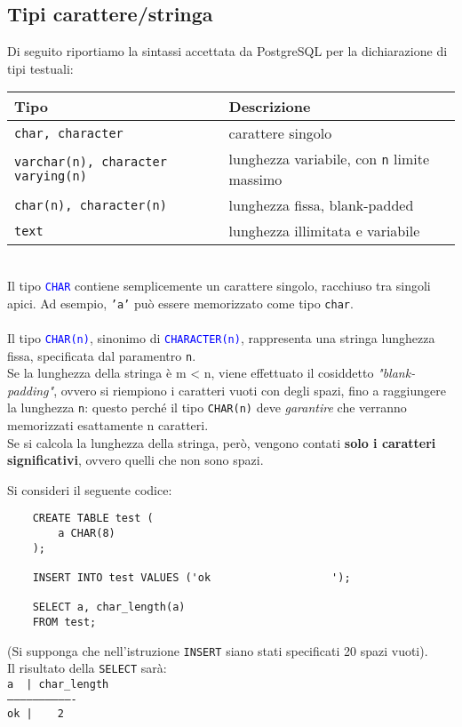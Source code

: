 \documentclass[12pt,a4paper]{book}
\begin{document}
	\subsection{Tipi carattere/stringa}
	Di seguito riportiamo la sintassi accettata da PostgreSQL per la dichiarazione di tipi testuali:\vspace{10px}\\
	\setlength{\tabcolsep}{10pt}
	\begin{tabular} {| l | l |}
		\hline
		Tipo & Descrizione\\
		\hline
		\texttt{char, character} & carattere singolo\\
		\texttt{varchar(n), character varying(n)} & lunghezza variabile, con \texttt{n} limite massimo\\
		\texttt{char(n), character(n)} 	& lunghezza fissa, blank-padded	\\
		\texttt{text} & lunghezza illimitata e variabile\\
		\hline
	\end{tabular}\vspace{10px}\\
	Il tipo \textcolor{blue}{\texttt{CHAR}} contiene semplicemente un carattere singolo, racchiuso tra singoli apici. Ad esempio, \texttt{'a'} può essere memorizzato come tipo \texttt{char}.\\ \\
	Il tipo \textcolor{blue}{\texttt{CHAR(n)}}, sinonimo di \textcolor{blue}{\texttt{CHARACTER(n)}}, rappresenta una stringa lunghezza fissa, specificata dal paramentro \texttt{n}.\\
	Se la lunghezza della stringa è m < n, viene effettuato il cosiddetto \textit{"blank-padding"}, ovvero si riempiono i caratteri vuoti con degli spazi, fino a raggiungere la lunghezza \texttt{n}: questo perché il tipo \texttt{CHAR(n)} deve \textit{garantire} che verranno memorizzati esattamente n caratteri.\\Se si calcola la lunghezza della stringa, però, vengono contati \textbf{solo i caratteri significativi}, ovvero quelli che non sono spazi.\\
	\begin{tcolorbox}[enhanced jigsaw, breakable, title=Esempio, title filled]
	Si consideri il seguente codice:
	\begin{lstlisting}
	CREATE TABLE test (
		a CHAR(8)
	);
		
	INSERT INTO test VALUES ('ok                   ');
	
	SELECT a, char_length(a) 
	FROM test;
	\end{lstlisting}
	(Si supponga che nell'istruzione \texttt{INSERT} siano stati specificati 20 spazi vuoti).\\
	Il risultato della \texttt{SELECT} sarà:\vspace{10px}\\
	\texttt{a$\quad$| char_length\\   -------------------------------\\ok  |$\quad\quad$2 }
	\end{tcolorbox}
\end{document}
